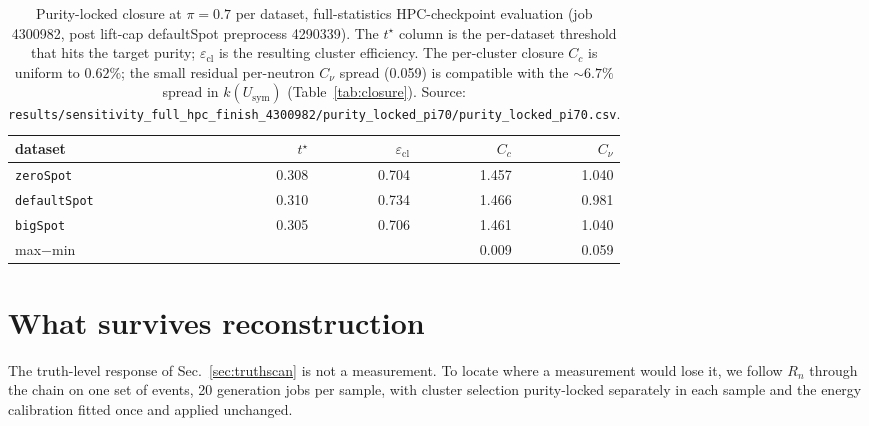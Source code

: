 \documentclass[aps,prc,twocolumn,superscriptaddress,showpacs,%
               nofootinbib,floatfix,longbibliography]{revtex4-2}
\newcommand{\Usym}{U_{\text{sym}}}
\begin{document}
\begin{table}[!t]
  \centering
  \caption{Purity-locked closure at $\pi = 0.7$ per dataset,
    full-statistics HPC-checkpoint evaluation
    (job 4300982, post lift-cap defaultSpot preprocess 4290339).
    The $t^\star$ column is the per-dataset
    threshold that hits the target purity; $\varepsilon_{\text{cl}}$
    is the resulting cluster efficiency.  The per-cluster closure
    $C_c$ is uniform to $0.62\%$; the small residual per-neutron
    $C_\nu$ spread (0.059) is compatible with the $\sim 6.7\%$
    spread in $k(\Usym)$ (Table~\ref{tab:closure}).
    Source: \texttt{results/sensitivity\_full\_hpc\_finish\_4300982/purity\_locked\_pi70/purity\_locked\_pi70.csv}.}
  \label{tab:purity_locked}
  \begin{tabular}{lrrrr}
    \toprule
    dataset & $t^\star$ & $\varepsilon_{\text{cl}}$ & $C_c$ & $C_\nu$ \\
    \midrule
    \texttt{zeroSpot}    & 0.308 & 0.704 & 1.457 & 1.040 \\
    \texttt{defaultSpot} & 0.310 & 0.734 & 1.466 & 0.981 \\
    \texttt{bigSpot}     & 0.305 & 0.706 & 1.461 & 1.040 \\
    \midrule
    max$-$min            &        &        & 0.009 & 0.059 \\
    \bottomrule
  \end{tabular}
\end{table}

\section{What survives reconstruction}
\label{sec:recoladder}

The truth-level response of Sec.~\ref{sec:truthscan} is not a
measurement.  To locate where a measurement would lose it, we follow
$R_n$ through the chain on one set of events, 20 generation jobs per
sample, with cluster selection purity-locked separately in each sample
and the energy calibration fitted once and applied unchanged.
\end{document}
